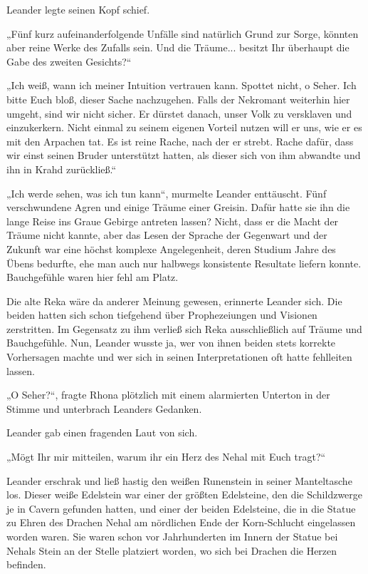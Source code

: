 \documentclass[10pt, a4paper, oneside]{book}
\begin{document}
Leander legte seinen Kopf schief.

„Fünf kurz aufeinanderfolgende Unfälle sind natürlich Grund zur Sorge, könnten aber reine Werke des Zufalls sein. Und die Träume... besitzt Ihr überhaupt die Gabe des zweiten Gesichts?“

„Ich weiß, wann ich meiner Intuition vertrauen kann. Spottet nicht, o Seher. Ich bitte Euch bloß, dieser Sache nachzugehen. Falls der Nekromant weiterhin hier umgeht, sind wir nicht sicher. Er dürstet danach, unser Volk zu versklaven und einzukerkern. Nicht einmal zu seinem eigenen Vorteil nutzen will er uns, wie er es mit den Arpachen tat. Es ist reine Rache, nach der er strebt. Rache dafür, dass wir einst seinen Bruder unterstützt hatten, als dieser sich von ihm abwandte und ihn in Krahd zurückließ.“

„Ich werde sehen, was ich tun kann“, murmelte Leander enttäuscht. Fünf verschwundene Agren und einige Träume einer Greisin. Dafür hatte sie ihn die lange Reise ins Graue Gebirge antreten lassen? Nicht, dass er die Macht der Träume nicht kannte, aber das Lesen der Sprache der Gegenwart und der Zukunft war eine höchst komplexe Angelegenheit, deren Studium Jahre des Übens bedurfte, ehe man auch nur halbwegs konsistente Resultate liefern konnte. Bauchgefühle waren hier fehl am Platz.

Die alte Reka wäre da anderer Meinung gewesen, erinnerte Leander sich. Die beiden hatten sich schon tiefgehend über Prophezeiungen und Visionen zerstritten. Im Gegensatz zu ihm verließ sich Reka ausschließlich auf Träume und Bauchgefühle. Nun, Leander wusste ja, wer von ihnen beiden stets korrekte Vorhersagen machte und wer sich in seinen Interpretationen oft hatte fehlleiten lassen.

„O Seher?“, fragte Rhona plötzlich mit einem alarmierten Unterton in der Stimme und unterbrach Leanders Gedanken.

Leander gab einen fragenden Laut von sich.

„Mögt Ihr mir mitteilen, warum ihr ein Herz des Nehal mit Euch tragt?“

Leander erschrak und ließ hastig den weißen Runenstein in seiner Manteltasche los. Dieser weiße Edelstein war einer der größten Edelsteine, den die Schildzwerge je in Cavern gefunden hatten, und einer der beiden Edelsteine, die in die Statue zu Ehren des Drachen Nehal am nördlichen Ende der Korn-Schlucht eingelassen worden waren. Sie waren schon vor Jahrhunderten im Innern der Statue bei Nehals Stein an der Stelle platziert worden, wo sich bei Drachen die Herzen befinden.
\end{document}
